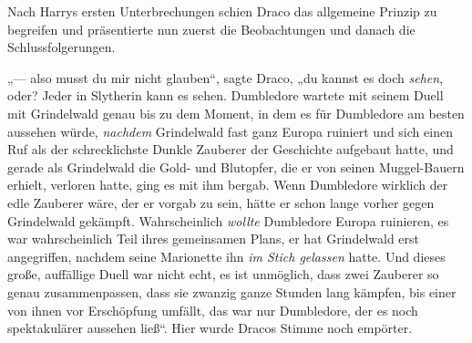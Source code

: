 Nach Harrys ersten Unterbrechungen schien Draco das allgemeine Prinzip zu begreifen und präsentierte nun zuerst die Beobachtungen und danach die Schlussfolgerungen.

„— also musst du mir nicht glauben“, sagte Draco, „du kannst es doch \emph{sehen}, oder? Jeder in Slytherin kann es sehen. Dumbledore wartete mit seinem Duell mit Grindelwald genau bis zu dem Moment, in dem es für Dumbledore am besten aussehen würde, \emph{nachdem} Grindelwald fast ganz Europa ruiniert und sich einen Ruf als der schrecklichste Dunkle Zauberer der Geschichte aufgebaut hatte, und gerade als Grindelwald die Gold- und Blutopfer, die er von seinen Muggel-Bauern erhielt, verloren hatte, ging es mit ihm bergab. Wenn Dumbledore wirklich der edle Zauberer wäre, der er vorgab zu sein, hätte er schon lange vorher gegen Grindelwald gekämpft. Wahrscheinlich \emph{wollte} Dumbledore Europa ruinieren, es war wahrscheinlich Teil ihres gemeinsamen Plans, er hat Grindelwald erst angegriffen, nachdem seine Marionette ihn \emph{im Stich gelassen} hatte. Und dieses große, auffällige Duell war nicht echt, es ist unmöglich, dass zwei Zauberer so genau zusammenpassen, dass sie zwanzig ganze Stunden lang kämpfen, bis einer von ihnen vor Erschöpfung umfällt, das war nur Dumbledore, der es noch spektakulärer aussehen ließ“. Hier wurde Dracos Stimme noch empörter.
